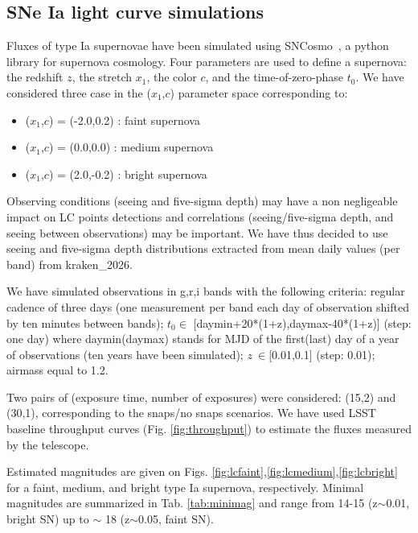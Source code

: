 \documentclass[\docopts]{\docclass}
\newcommand{\sne}{{SNe Ia }}
\newcommand{\sncosmo}{{\sc SNCosmo}}
\newcommand{\redshift}{{$z$}}
\newcommand{\snstretch}{{$x_{1}$}}
\newcommand{\sncolor}{{$c$}}
\newcommand{\daymax}{{$t_{0}$}}
\begin{document}
\subsection{\sne light curve simulations}
Fluxes of type Ia supernovae have been simulated using \sncosmo~\cite{2016ascl.soft11017B}, a python library for supernova cosmology. Four parameters are used to define a supernova: the redshift \redshift, the stretch \snstretch, the color \sncolor, and the time-of-zero-phase \daymax. We have considered three case in the (\snstretch,\sncolor) parameter space corresponding to:
\begin{itemize}
\item (\snstretch,\sncolor) = (-2.0,0.2) : faint supernova
\item (\snstretch,\sncolor) = (0.0,0.0) : medium supernova
 \item (\snstretch,\sncolor) = (2.0,-0.2) : bright supernova
\end{itemize}
Observing conditions (seeing and five-sigma depth) may have a non negligeable impact on LC points detections and correlations (seeing/five-sigma depth, and  seeing between observations) may be important. We have thus decided to use seeing and five-sigma depth distributions extracted from mean daily values (per band) from kraken\_2026.\par
We have simulated observations in g,r,i bands with the following criteria:  regular cadence of three days (one measurement per band each day of observation shifted by ten minutes between bands); \daymax $\in$ [daymin+20*(1+z),daymax-40*(1+z)] (step: one day) where daymin(daymax)  stands for MJD of the first(last)  day of a year of observations (ten years have been simulated); $z~\in$[0.01,0.1] (step: 0.01); airmass equal to 1.2. \par
Two pairs of (exposure time, number of exposures) were considered: (15,2) and (30,1), corresponding to the snaps/no snaps scenarios.  We have used LSST baseline throughput curves (Fig. \ref{fig:throughput}) to estimate the fluxes measured by the telescope.


Estimated magnitudes are given on Figs. \ref{fig:lcfaint},\ref{fig:lcmedium},\ref{fig:lcbright} for a faint, medium, and bright type Ia supernova, respectively. Minimal magnitudes are summarized in Tab. \ref{tab:minimag} and range from 14-15 (z$\sim$0.01, bright SN) up to $\sim$ 18 (z$\sim$0.05, faint SN). 
\end{document}
